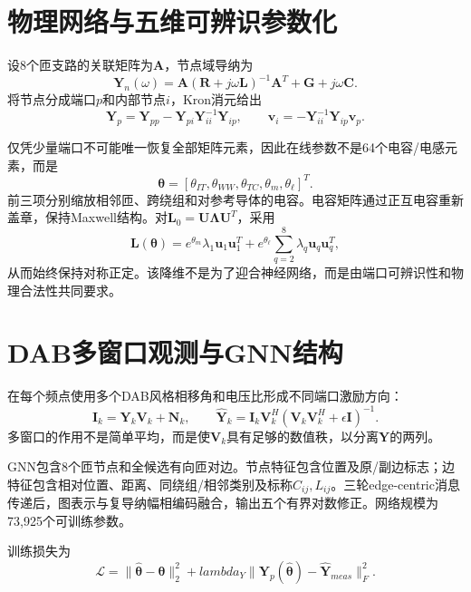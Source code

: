 \documentclass[11pt,a4paper]{ctexart}
\newcommand{\vect}[1]{\bm{#1}}
\begin{document}
\section{物理网络与五维可辨识参数化}
设8个匝支路的关联矩阵为$\vect A$，节点域导纳为
\begin{equation}
\vect Y_n(\omega)=\vect A(\vect R+j\omega\vect L)^{-1}\vect A^T+\vect G+j\omega\vect C.
\end{equation}
将节点分成端口$p$和内部节点$i$，Kron消元给出
\begin{equation}
\vect Y_p=\vect Y_{pp}-\vect Y_{pi}\vect Y_{ii}^{-1}\vect Y_{ip},\qquad
\vect v_i=-\vect Y_{ii}^{-1}\vect Y_{ip}\vect v_p.
\end{equation}

仅凭少量端口不可能唯一恢复全部矩阵元素，因此在线参数不是64个电容/电感元素，而是
\begin{equation}
\vect\theta=[\theta_{IT},\theta_{WW},\theta_{TC},\theta_m,\theta_\ell]^T.
\end{equation}
前三项分别缩放相邻匝、跨绕组和对参考导体的电容。电容矩阵通过正互电容重新盖章，保持Maxwell结构。对$\vect L_0=\vect U\vect\Lambda\vect U^T$，采用
\begin{equation}
\vect L(\vect\theta)=e^{\theta_m}\lambda_1\vect u_1\vect u_1^T+
e^{\theta_\ell}\sum_{q=2}^{8}\lambda_q\vect u_q\vect u_q^T,
\end{equation}
从而始终保持对称正定。该降维不是为了迎合神经网络，而是由端口可辨识性和物理合法性共同要求。

\section{DAB多窗口观测与GNN结构}
在每个频点使用多个DAB风格相移角和电压比形成不同端口激励方向：
\begin{equation}
\vect I_k=\vect Y_k\vect V_k+\vect N_k,
\qquad
\widehat{\vect Y}_k=\vect I_k\vect V_k^H(\vect V_k\vect V_k^H+\epsilon\vect I)^{-1}.
\end{equation}
多窗口的作用不是简单平均，而是使$\vect V_k$具有足够的数值秩，以分离$\vect Y$的两列。

GNN包含8个匝节点和全候选有向匝对边。节点特征包含位置及原/副边标志；边特征包含相对位置、距离、同绕组/相邻类别及标称$C_{ij},L_{ij}$。三轮edge-centric消息传递后，图表示与复导纳幅相编码融合，输出五个有界对数修正。网络规模为73,925个可训练参数。

训练损失为
\begin{equation}
\mathcal L=\|\widehat{\vect\theta}-\vect\theta\|_2^2+lambda_Y
\|\vect Y_p(\widehat{\vect\theta})-\widehat{\vect Y}_{meas}\|_F^2.
\end{equation}
\end{document}
